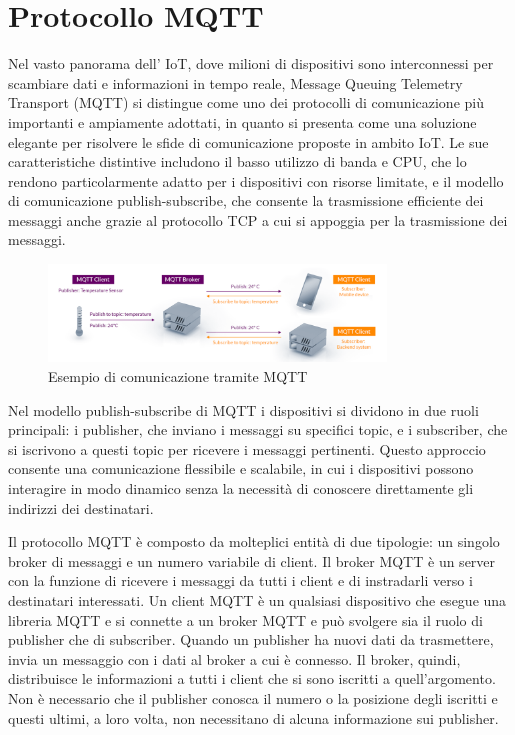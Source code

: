 \documentclass[12pt,a4paper,openright,twoside]{book}
\begin{document}
\section{Protocollo MQTT}

Nel vasto panorama dell' \ac{IoT}, dove milioni di dispositivi sono interconnessi per scambiare dati e informazioni in tempo reale, Message Queuing Telemetry Transport (MQTT) 
si distingue come uno dei protocolli di comunicazione più importanti e ampiamente adottati, in quanto si presenta come una soluzione elegante per risolvere le sfide di 
comunicazione proposte in ambito \ac*{IoT}. Le sue caratteristiche distintive includono il basso utilizzo di banda e CPU, che lo rendono particolarmente adatto per i 
dispositivi con risorse limitate, e il modello di comunicazione publish-subscribe, che consente la trasmissione efficiente dei messaggi anche grazie al protocollo 
\ac{TCP} a cui si appoggia per la trasmissione dei messaggi.

\begin{figure}[H]
    \centering
    \includegraphics[width=0.8\textwidth]{figures/mqtt-example.png}
    \caption{Esempio di comunicazione tramite MQTT}
    \label{fig:mqtt-example}
\end{figure}

Nel modello publish-subscribe di \ac{MQTT} i dispositivi si dividono in due ruoli principali:
 i publisher, che inviano i messaggi su specifici topic, e i subscriber, che si iscrivono a questi topic per ricevere i messaggi pertinenti. 
 Questo approccio consente una comunicazione flessibile e scalabile, in cui i dispositivi possono interagire in modo dinamico senza la necessità
 di conoscere direttamente gli indirizzi dei destinatari.

Il protocollo \ac{MQTT} è composto da molteplici entità di due tipologie: un singolo broker di messaggi e un numero variabile di client. Il broker \ac{MQTT} è un server 
con la funzione di ricevere i messaggi da tutti i client e di instradarli verso i destinatari interessati. Un client \ac{MQTT} è un qualsiasi dispositivo che esegue una libreria 
\ac{MQTT} e si connette a un broker \ac{MQTT} e può svolgere sia il ruolo di publisher che di subscriber. Quando un publisher ha nuovi dati da trasmettere, 
invia un messaggio con i dati al broker a cui è connesso. Il broker, quindi, distribuisce le informazioni a tutti i client che si sono iscritti a quell’argomento. 
Non è necessario che il publisher conosca il numero o la posizione degli iscritti e questi ultimi, a loro volta, non necessitano di alcuna informazione sui publisher.
\end{document}
